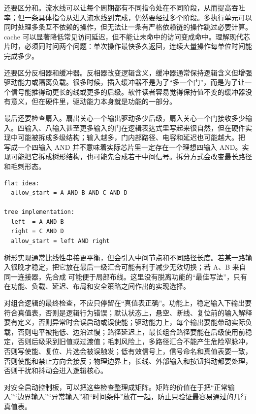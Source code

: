 还要区分和。流水线可以让每个周期都有不同指令处在不同阶段，从而提高吞吐率；但一条具体指令从进入流水线到完成，仍然要经过多个阶段。多执行单元可以同时处理多条互不依赖的操作，但无法让一条有严格依赖链的操作跳过必要计算。cache 可以显著降低常见访问延迟，但不能让未命中的访问变成命中。理解现代芯片时，必须同时问两个问题：单次操作最快多久返回，连续大量操作每单位时间能完成多少。

还要区分反相器和缓冲器。反相器改变逻辑含义，缓冲器通常保持逻辑含义但增强驱动能力或隔离负载。很多时候，插入缓冲器不是为了“多一个门”，而是为了让一个信号能推得动更长的线或更多的后级。软件读者容易觉得保持值不变的缓冲器没有意义，但在硬件里，驱动能力本身就是功能的一部分。

最后还要检查扇入。扇出关心一个输出驱动多少后级，扇入关心一个门接收多少输入。四输入、八输入甚至更多输入的门在逻辑表达式里写起来很自然，但在硬件实现中可能被拆成多级结构；输入越多，门内部路径、电容和延迟也可能越大。把  写成一个四输入 AND 并不意味着实际芯片里一定存在一个理想四输入 AND。实现可能把它拆成树形结构，也可能先合成若干中间信号。拆分方式会改变最长路径和毛刺形态。

\begin{lstlisting}
flat idea:
  allow_start = A AND B AND C AND D

tree implementation:
  left  = A AND B
  right = C AND D
  allow_start = left AND right
\end{lstlisting}

树形实现通常比线性串接更平衡，但会引入中间节点和不同路径长度。若某一路输入很晚才稳定，把它放在最后一级汇合可能有利于减少无效切换；若 A、B 来自同一连接器，先合成  可能便于局部布线。这里没有脱离功能的“最佳写法”，只有在功能、负载、延迟、布局和安全策略之间作出的实现选择。

对组合逻辑的最终检查，不应只停留在“真值表正确”。功能上，稳定输入下输出要符合真值表，否则是逻辑行为错误；默认状态上，悬空、断线、复位前的输入解释要有定义，否则异常时会误启动或误使能；驱动能力上，每个输出要能带动实际负载，否则电平被拖低、边沿过慢；路径延迟上，最长组合路径要能在后级使用前稳定，否则后级采到旧值或过渡值；毛刺风险上，多路径汇合不能产生危险窄脉冲，否则写使能、复位、片选会被误触发；低有效信号上，信号命名和真值表要一致，否则使能和禁止方向会接反；物理边界上，长线、外部输入和按钮抖动都要处理，否则干扰和抖动会进入逻辑核心。

对安全启动控制板，可以把这些检查整理成矩阵。矩阵的价值在于把“正常输入”“边界输入”“异常输入”和“时间条件”放在一起，防止只验证最容易通过的几行真值表。

